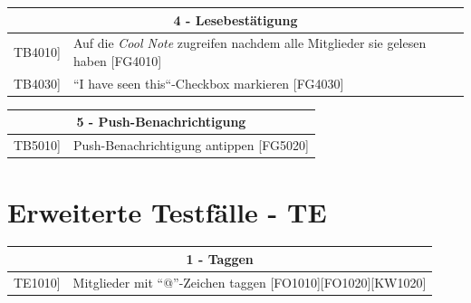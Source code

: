 \documentclass[a4paper]{scrreprt}
\begin{document}
	    \vspace{5mm}
	    
	    \begin{table}[h!]
	    	\centering
	    	\label{my-label}
	    	\begin{tabular}{p{2cm}p{12cm}}
	    		
	    		\multicolumn{2}{c}{\textbf{4 - Lesebestätigung}} \\ \hline
	    		\centering{[}TB4010{]} & Auf die \textit{Cool Note} zugreifen nachdem alle Mitglieder sie  gelesen haben {[}FG4010{]}\\
	    		\centering{[}TB4030{]}& ``I have seen this``-Checkbox markieren {[}FG4030{]}\\ 
	    		
	    		\hline
	    	\end{tabular}
	    \end{table}
	    
	    \vspace{5mm}
	    
	    \begin{table}[h!]
	    	\centering
	    	\label{my-label}
	    	\begin{tabular}{p{2cm}p{12cm}}
	    		
	    		\multicolumn{2}{c}{\textbf{5 - Push-Benachrichtigung}} \\ \hline
	    		\centering{[}TB5010{]} & Push-Benachrichtigung antippen {[}FG5020{]}\\
	    		
	    		
	    		\hline
	    	\end{tabular}
	    \end{table}
	    
	    \clearpage
	    
	    \section{Erweiterte Testfälle - TE}
	    
	    \begin{table}[h]
	    	\centering
	    	\label{my-label}
	    	\begin{tabular}{p{2cm}p{12cm}}
	    		
	    		\multicolumn{2}{c}{\textbf{1 - Taggen}} \\ \hline
	    		\centering{[}TE1010{]} & Mitglieder mit “@”-Zeichen taggen {[}FO1010{]}{[}FO1020{]}{[}KW1020{]}\\
	    		\hline
	    	\end{tabular}
	    \end{table}
	    
\end{document}
